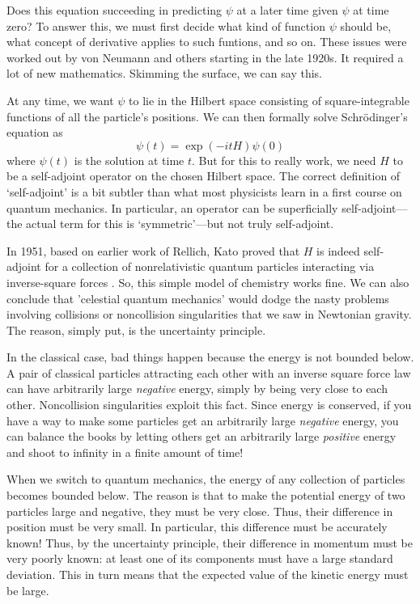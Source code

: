 \documentclass{article}
\begin{document}
Does this equation succeeding in predicting $\psi$ at a later time given $\psi$ at time zero?  To answer this, we must first decide what kind of function $\psi$ should be, what concept of derivative applies to such funtions, and so on.  These issues were worked out by von Neumann and others starting in the late 1920s.    It required a lot of new mathematics.   Skimming the surface, we can say this.

At any time, we want $\psi$ to lie in the Hilbert space consisting of square-integrable functions of all the particle's positions.   We can then formally solve Schr\"odinger's equation as
$$  \psi(t) = \exp(-i t H) \psi(0) $$
where $\psi(t)$ is the solution at time $t$.  But for this to really work, we need $H$ to be a self-adjoint operator on the chosen Hilbert space.  The correct definition of `self-adjoint' is a bit subtler than what most physicists learn in a first course on quantum mechanics.  In particular, an operator can be superficially self-adjoint---the actual term for this is `symmetric'---but not truly self-adjoint.  

In 1951, based on earlier work of Rellich, Kato proved that $H$ is indeed self-adjoint for a collection of nonrelativistic quantum particles interacting via inverse-square forces \cite{Kato,Rellich}.   So, this simple model of chemistry works fine.  We can also conclude that 'celestial quantum mechanics' would dodge the nasty problems involving collisions or noncollision singularities that we saw in Newtonian gravity.   The reason, simply put, is the uncertainty principle.  

In the classical case, bad things happen because the energy is not bounded below.  A pair of classical particles attracting each other with an inverse square force law can have arbitrarily large \emph{negative} energy, simply by being very close to each other.   Noncollision singularities exploit this fact.  Since energy is conserved, if you have a way to make some particles get an arbitrarily large \emph{negative} energy, you can balance the books by letting others get an arbitrarily large \emph{positive} energy and shoot to infinity in a finite amount of time!

When we switch to quantum mechanics, the energy of any collection of particles becomes bounded below.  The reason is that to make the potential energy of two particles large and negative, they must be very close.  Thus, their difference in position must be very small.  In particular, this difference must be accurately known!  Thus, by the uncertainty principle, their difference in momentum must be very poorly known: at least one of its components must have a large standard deviation.   This in turn means that the expected value of the kinetic energy must be large.
\end{document}
